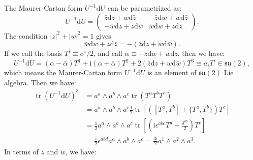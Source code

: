 \documentclass{book}
\begin{document}
The Maurer-Cartan form $U^{-1}\mathrm{d} U$ can be parametrized as:
\begin{equation*}
U^{-1}\mathrm{d} U=\begin{pmatrix}
\bar{z}\mathrm{d} z+w\mathrm{d}\bar{z} & -\bar{z}\mathrm{d} w+w\mathrm{d}\bar{z}\\
-\bar{w}\mathrm{d} z+z\mathrm{d}\bar{w} & \bar{w}\mathrm{d} w+z\mathrm{d}\bar{z}
\end{pmatrix} .
\end{equation*}
The condition $| z| ^{2} +| w| ^{2} =1$ gives
\begin{equation*}
\bar{w}\mathrm{d} w+z\mathrm{d}\bar{z} =-(\bar{z}\mathrm{d} z+w\mathrm{d}\bar{w}) .
\end{equation*}
If we call the basis $T^{i} \equiv \sigma ^{i} /2$, and call $\alpha \equiv -\bar{z}\mathrm{d} w+w\mathrm{d} z$, then we have:
\begin{equation*}
U^{-1}\mathrm{d} U=( \alpha -\bar{\alpha }) T^{1} +\mathrm{i}( \alpha +\bar{\alpha }) T^{2} +2(\bar{z}\mathrm{d} z+w\mathrm{d}\bar{w}) T^{3} \equiv a_{i} T^{i} \in \mathfrak{su}( 2) ,
\end{equation*}
which means the Maurer-Cartan form $U^{-1}\mathrm{d} U$ is an element of $\mathfrak{su}( 2)$ Lie algebra. Then we have:
\begin{equation*}
\begin{aligned}
\operatorname{tr} (U^{-1}\mathrm{d} U)^{3} & =a^{a} \land a^{b} \land a^{c}\operatorname{tr}( T^{a} T^{b} T^{c} )\\
 & =a^{a} \land a^{b} \land a^{c}\frac{1}{2}\operatorname{tr} [([T^{a} ,T^{b} ]+\{T^{a} ,T^{b} \})T^{c} ]\\
 & =\frac{1}{2} a^{a} \land a^{b} \land a^{c}\operatorname{tr}\left[\left(\mathrm{i} \epsilon ^{abc} T^{d} +\frac{\delta ^{ab}}{2}\right) T^{c}\right]\\
 & =\frac{\mathrm{i}}{2} \epsilon ^{abd} a^{a} \land a^{b} \land a^{c} =\frac{3\mathrm{i}}{2} a^{1} \land a^{2} \land a^{3} .
\end{aligned}
\end{equation*}
In terms of $z$ and $w$, we have:
\end{document}
